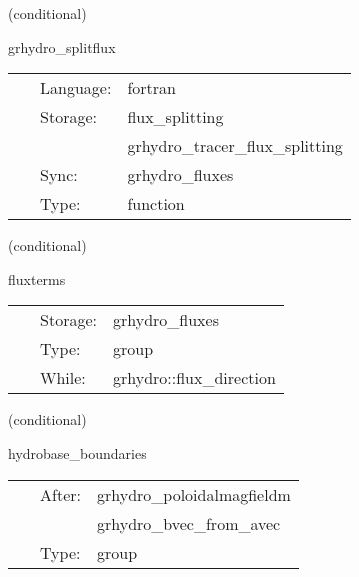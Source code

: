 \documentclass{article}
\begin{document}
\vspace{5mm}

   (conditional) 

\hspace{5mm} grhydro\_splitflux 

\hspace{5mm}{\it compute the fluxes using weno5 fd + lax-friedrichs splitting } 


\hspace{5mm}

 \begin{tabular*}{160mm}{cll} 
~ & Language:  & fortran \\ 
~ & Storage:  & flux\_splitting \\ 
~& ~ &grhydro\_tracer\_flux\_splitting\\ 
~ & Sync:  & grhydro\_fluxes \\ 
~ & Type:  & function \\ 
\end{tabular*} 


\vspace{5mm}

   (conditional) 

\hspace{5mm} fluxterms 

\hspace{5mm}{\it calculation of intercell fluxes } 


\hspace{5mm}

 \begin{tabular*}{160mm}{cll} 
~ & Storage:  & grhydro\_fluxes \\ 
~ & Type:  & group \\ 
~ & While:  & grhydro::flux\_direction \\ 
\end{tabular*} 


\vspace{5mm}

   (conditional) 

\hspace{5mm} hydrobase\_boundaries 

\hspace{5mm}{\it call boundary conditions after magnetic field initial data setup } 


\hspace{5mm}

 \begin{tabular*}{160mm}{cll} 
~ & After:  & grhydro\_poloidalmagfieldm \\ 
~& ~ &grhydro\_bvec\_from\_avec\\ 
~ & Type:  & group \\ 
\end{tabular*} 
\end{document}
